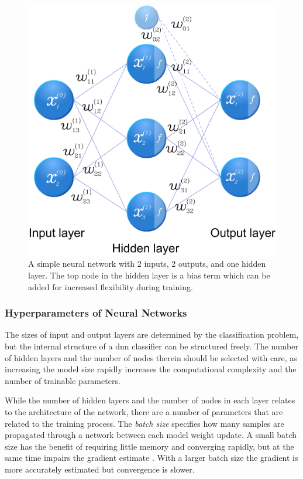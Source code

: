 \begin{figure}[h]
	\centering
	\includegraphics[scale=0.3]{figs_temp/network_graph.jpg}
	\caption{A simple neural network with 2 inputs, 2 outputs, and one hidden layer. The top node in the hidden layer is a bias term which can be added for increased flexibility during training.}
	\label{fig:ann}
\end{figure}

\subsubsection{Hyperparameters of Neural Networks}

The sizes of input and output layers are determined by the classification problem, but the internal structure of a \gls{dnn} classifier can be structured freely. The number of hidden layers and the number of nodes therein should be selected with care, as increasing the model size rapidly increases the computational complexity and the number of trainable parameters.

While the number of hidden layers and the number of nodes in each layer relates to the architecture of the network, there are a number of parameters that are related to the training process. The \emph{batch size} specifies how many samples are propagated through a network between each model weight update. A small batch size has the benefit of requiring little memory and converging rapidly, but at the same time impairs the gradient estimate \citep{brownlee_2017}. With a larger batch size the gradient is more accurately estimated but convergence is slower. 


